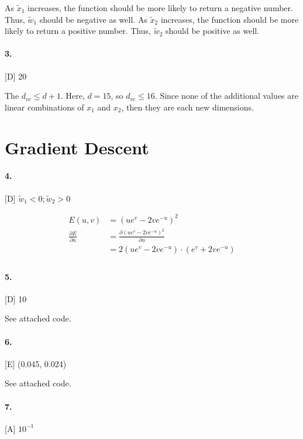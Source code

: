 \documentclass[10pt,letter]{article}
\begin{document}
	As $\widetilde x_1$ increases, the function should be more likely to return a negative number. Thus, $\widetilde {w }_1$ should be negative as well. As $ \widetilde x_2$ increases, the function should be more likely to return a positive number. Thus, $\widetilde { w }_2$ should be positive as well.

\paragraph{3.} [D] 20

	The $d_{vc} \leq d + 1$. Here, $d = 15$, so $d_{vc} \leq 16$. Since none of the additional values are linear combinations of $x_1$ and $x_2$, then they are each new dimensions. 

\section*{Gradient Descent}

\paragraph{4.} [D] $\widetilde{w}_1 < 0; \widetilde{w}_2 > 0$

	\begin{align*}
	E(u,v) &= (ue^v - 2ve^{-u})^2 \\
	\frac{\partial E}{\partial u} &= \frac{\partial (ue^v - 2ve^{-u})^2}{\partial u} \\
	&= 2(ue^v - 2ve^{-u})\cdot(e^v + 2ve^{-u}) \\
	\end{align*}

\paragraph{5.} [D] 10

	See attached code. 

\paragraph{6.} [E] (0.045, 0.024)

	See attached code. 

\paragraph{7.} [A] $10^{-1}$
\end{document}
